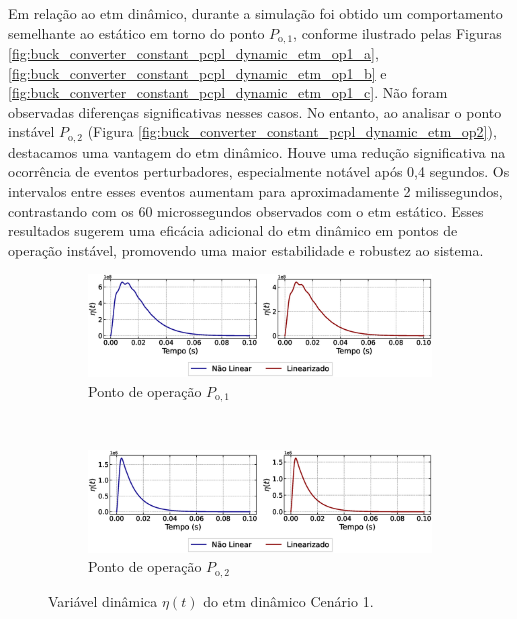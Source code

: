 Em relação ao \acrshort{etm} dinâmico, durante a simulação foi obtido um comportamento semelhante ao estático em torno do ponto $P_{\mathrm{o}, 1}$, conforme ilustrado pelas Figuras \ref{fig:buck_converter_constant_pcpl_dynamic_etm_op1_a}, \ref{fig:buck_converter_constant_pcpl_dynamic_etm_op1_b} e \ref{fig:buck_converter_constant_pcpl_dynamic_etm_op1_c}. Não foram observadas diferenças significativas nesses casos. No entanto, ao analisar o ponto instável $P_{\mathrm{o}, 2}$ (Figura \ref{fig:buck_converter_constant_pcpl_dynamic_etm_op2}), destacamos uma vantagem do \acrshort{etm} dinâmico. Houve uma redução significativa na ocorrência de eventos perturbadores, especialmente notável após 0,4 segundos. Os intervalos entre esses eventos aumentam para aproximadamente 2 milissegundos, contrastando com os 60 microssegundos observados com o \acrshort{etm} estático. Esses resultados sugerem uma eficácia adicional do \acrshort{etm} dinâmico em pontos de operação instável, promovendo uma maior estabilidade e robustez ao sistema.

\begin{figure}[H]
  \centering
  \captionsetup{justification=centering}
  \begin{subfigure}{1.\textwidth}
    \centering
    \includegraphics[width=1.\textwidth]{figuras/dynamic-etm/buck/sim1/op1/eta.eps}
    \caption{Ponto de operação $P_{\mathrm{o}, 1}$}
  \end{subfigure}
  \\[6pt]
  \begin{subfigure}{1.\textwidth}
    \centering
    \includegraphics[width=1.\textwidth]{figuras/dynamic-etm/buck/sim1/op2/eta.eps}
    \caption{Ponto de operação $P_{\mathrm{o}, 2}$}
    \label{fig:buck_converter_dynamic_pcpl_dynamic_etm_op2_d}
  \end{subfigure}
  \caption{Variável dinâmica $\eta(t)$ do \acrshort{etm} dinâmico Cenário 1.}
  \label{fig:buck_converter_constant_pcpl_dynamic_etm_eta}
\end{figure}

